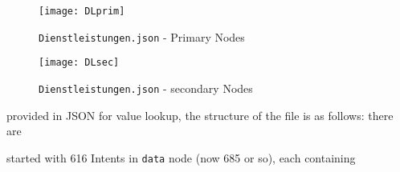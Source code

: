 
%





\begin{figure}[h!]
	\caption{\texttt{Dienstleistungen.json}  - Primary Nodes}
	\texttt{[image: DLprim]}
\end{figure}

\begin{figure}[h]
	\caption{\texttt{Dienstleistungen.json} - secondary Nodes}
	\texttt{[image: DLsec]}
\end{figure}



provided in JSON for value lookup, the structure of the file is as follows: there are 


started with 616 Intents in \lstinline|data| node (now 685 or so), each containing \inote{}

